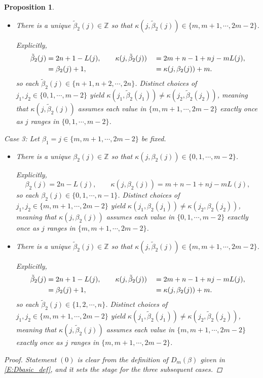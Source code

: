 \documentclass[letterpaper,11pt,reqno]{amsart}
\theoremstyle{plain}
\newtheorem{proposition}[equation]{Proposition}
\theoremstyle{definition}
\theoremstyle{remark}
\theoremstyle{remark}
\numberwithin{equation}{section}
\newcommand{\Z}{{\mathbb Z}}
\begin{document}
\begin{proposition}
\begin{itemize}
\item[(2b)] 
There is a unique $\tilde{\beta}_2(j) \in \Z$ so that $\kappa(j,\tilde\beta_2(j)) \in \{m,m+1,\cdots, 2m-2 \}$.

Explicitly, 
\begin{alignat}{2}
\tilde\beta_2(j) &= 2n + 1 - L(j), \qquad \kappa(j,\tilde\beta_2(j)) &&= 2m + n -1 + nj - m L(j), \\
 &= \beta_2(j) + 1, \qquad &&= \kappa(j,\beta_2(j)) + m. \notag
\end{alignat}
so each $\tilde\beta_2(j) \in \{n+1,n+2, \cdots, 2n \}$.
Distinct choices of $j_1,j_2 \in \{0,1,\cdots,m-2 \}$ yield $\kappa(j_1,\tilde\beta_2(j_1)) \neq \kappa(j_2,\tilde\beta_2(j_2))$, meaning that $\kappa(j,\tilde\beta_2(j))$ assumes each value in $\{m,m+1,\cdots,2m-2 \}$ exactly once as $j$ ranges in $\{0,1,\cdots,m-2 \}$.
\end{itemize}

\noindent  Case 3: Let $\beta_1 = j \in \{m,m+1,\cdots,2m-2 \}$ be fixed.

\begin{itemize}

\item[(3a)] 
There is a unique $\beta_2(j) \in \Z$ so that $\kappa(j,\beta_2(j)) \in \{0,1,\cdots,m-2 \}$.

Explicitly, 
\begin{equation}
\beta_2(j) = 2n - L(j), \qquad \kappa(j,\beta_2(j)) = m + n -1 + nj - m L(j),
\end{equation}
so each $\beta_2(j) \in \{0,1, \cdots, n-1 \}$.
Distinct choices of $j_1,j_2 \in \{m,m+1,\cdots,2m-2 \}$ yield $\kappa(j_1,\beta_2(j_1)) \neq \kappa(j_2,\beta_2(j_2))$, meaning that $\kappa(j,\beta_2(j))$ assumes each value in $\{0,1,\cdots,m-2 \}$ exactly once as $j$ ranges in $\{m,m+1,\cdots,2m-2 \}$.

\item[(3b)] 
There is a unique $\tilde{\beta}_2(j) \in \Z$ so that $\kappa(j,\tilde\beta_2(j)) \in \{m,m+1,\cdots, 2m-2 \}$.

Explicitly, 
\begin{alignat}{2}
\tilde\beta_2(j) &= 2n + 1 - L(j), \qquad \kappa(j,\tilde\beta_2(j)) &&= 2m + n -1 + nj - m L(j), \\
 &= \beta_2(j) + 1, \qquad &&= \kappa(j,\beta_2(j)) + m. \notag
\end{alignat}
so each $\tilde\beta_2(j) \in \{1,2, \cdots, n \}$.
Distinct choices of $j_1,j_2 \in \{m,m+1,\cdots,2m-2 \}$ yield $\kappa(j_1,\tilde\beta_2(j_1)) \neq \kappa(j_2,\tilde\beta_2(j_2))$, meaning that $\kappa(j,\tilde\beta_2(j))$ assumes each value in $\{m,m+1,\cdots,2m-2 \}$ exactly once as $j$ ranges in $\{m,m+1,\cdots,2m-2 \}$.
\end{itemize}
\begin{proof}
Statement $(0)$ is clear from the definition of $D_m(\beta)$ given in \eqref{E:Dbasic_def}, and it sets the stage for the three subsequent cases.


\end{proof}
\end{proposition}
\end{document}
